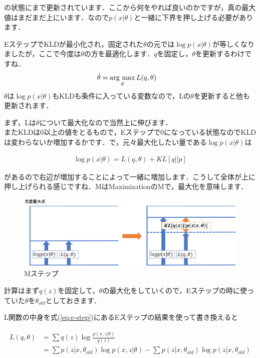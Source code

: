 \documentclass[11pt,a4paper,dvipdfmx]{ujreport}
\newcommand{\argmax}{\mathop{\rm arg~max}\limits}
\begin{document}
の状態にまで更新されています．ここから何をやれば良いのかですが，真の最大値はまだまだ上にいます．なので$p(x|\theta)$と一緒に下界を押し上げる必要があります．

EステップでKLDが最小化され，固定された$\theta$の元では$\log p(x|\theta)$が等しくなりましたが，ここで今度は$\theta$の方を最適化します．$q$を固定し，$\theta$を更新するわけですね．\\

\begin{align}
  \hat{\theta} &= \argmax_{\theta}L(q,\theta)
\end{align}
$\theta$は$\log p(x|\theta)$もKLDも条件に入っている変数なので，Lの$\theta$を更新すると他も更新されます．

まず，Lは$\theta$について最大化なので当然上に伸びます．\\

またKLDは0以上の値をとるもので，Eステップで0になっている状態なのでKLDは変わらないか増加するかです．で，元々最大化したい量である$\log p(x|\theta)$は

\begin{align}
  \log p(x|\theta) = L(q,\theta) + KL[q||p]\nonumber
\end{align}

があるので右辺が増加することによって一緒に増加します．こうして全体が上に押し上げられる感じですね．MはMaximizationのMで，最大化を意味します．

\begin{figure}[H]
  \label{im:em4}
  \centering
  \includegraphics[width=15cm]{../figures/em4.eps}
  \caption{Mステップ}
\end{figure}


計算はまず$q(z)$を固定して，$\theta$の最大化をしていくので，Eステップの時に使っていた$\theta$を$\theta_{old}$としておきます．

L関数の中身を式(\ref{eq:e-step})にあるEステップの結果を使って書き換えると

\begin{align}
  L(q,\theta) &= \sum q(z) \log \frac{p(x,z|\theta)}{q(z)}\\
  &= \sum p(z|x,\theta_{old})\log p(x,z|\theta) - \sum p(z|x,\theta_{old})\log p(z|x,\theta_{old})
\end{align}
\end{document}
